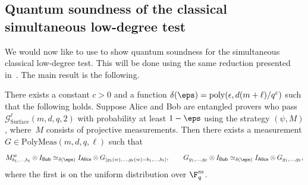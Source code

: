 \documentclass[11pt]{article}
\newcommand{\consistency}{\simeq}
\newcommand{\simulpolymeas}[4]{\mathrm{PolyMeas}(#1,#2,#3, #4)}
\newcommand{\game}{\mathscr{G}}
\newcommand{\reg}[1]{{\mathsf{#1}}}
\begin{document}
\subsection{Quantum soundness of the classical simultaneous low-degree test}\label{sec:q-simultaneous}

We would now like to use 
to show quantum soundness for the simultaneous classical low-degree test.
This will be done using the same reduction presented in~.
The main result is the following.

\begin{theorem}
  \label{thm:simultaneous-ldt}
There exists a constant $c > 0$ and a function $\delta(\eps) = \mathrm{poly}(\epsilon, d (m + \ell)/q^c)$ such that the following holds.
Suppose Alice and Bob are entangled provers who pass $\game_{\mathrm{Surface}}^\ell(m,d,q,2)$ with probability at least $1-\eps$
using the strategy $(\psi, M)$, where~$M$ consists of projective measurements.
Then there exists a measurement $G \in \simulpolymeas{m}{d}{q}{\ell}$ such that
\begin{equation*}
M^w_{b_1, \ldots, b_\ell} \otimes I_{\reg{Bob}} \consistency_{\delta(\eps)} I_{\reg{Alice}} \otimes G_{[g_1(w), \ldots, g_\ell(w) = b_1, \ldots, b_\ell]},
\qquad
G_{g_1, \ldots, g_\ell} \otimes I_{\reg{Bob}}
\consistency_{\delta(\eps)}
I_{\reg{Alice}} \otimes G_{g_1, \ldots, g_\ell},
\end{equation*}
where the first is on the uniform distribution over $\F_q^m$.
\end{theorem}
\end{document}

